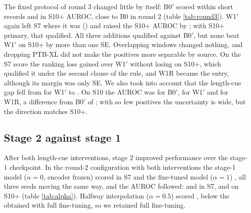 \documentclass{iopjournal}
\newcommand{\Bp}{B0$'$}
\newcommand{\Wp}{W1$'$}
\begin{document}
The fixed protocol of round 3 changed little by itself: \Bp{} scored \rThreeBzSseven{} within short records and \rThreeBzStenPlusAuc{} in S10+ AUROC, close to B0 in round 2 (table \ref{tab:round3}). \Wp{} again left S7 where it was (\rThreeWoneDSseven) and raised the S10+ AUROC by \rThreeWoneDStenPlusAuc; with S10+ primary, that qualified. All three additions qualified against \Bp, but none beat \Wp{} on S10+ by more than one SE. Overlapping windows changed nothing, and dropping PTB-XL did not make the positives more separable by source. On the S7 score the ranking loss gained \rThreeWoneRVsWoneDSseven{} over \Wp{} without losing on S10+, which qualified it under the second clause of the rule, and W1R became the entry, although its margin was only \rThreeWoneRVsWoneNse{} SE. We also took into account that the length-cue gap fell from \rThreeWoneGap{} for \Wp{} to \rThreeWoneRGap. On S10 the AUROC was \rThreeBzStenAuc{} for \Bp, \rThreeWoneStenAuc{} for \Wp{} and \rThreeWoneRStenAuc{} for W1R, a difference from \Bp{} of \rThreeWoneRDStenAuc; with so few positives the uncertainty is wide, but the direction matches S10+.

\begin{table}
\caption{Round 3, under the fixed validation protocol (three seeds unless stated). \Bp{} and \Wp{} are re-trained and are not the round-2 models. $\Delta$ is the difference from the \Bp{} mean, with the SE of a paired bootstrap. S10+ mixes CODE-15\% negatives with mostly SaMi-Trop positives; S10 is CODE-15\% only, with \nStenPos{} positives. Supplementary note 4 shows the same runs seed by seed.}
\centering
\resizebox{\textwidth}{!}{}
\label{tab:round3}
\end{table}

\subsection{Stage 2 against stage 1}
\label{sec:res-ft}
After both length-cue interventions, stage 2 improved performance over the stage-1 checkpoint. In the round-2 configuration with both interventions the stage-1 model ($\alpha=0$, encoder frozen) scored \frozenSseven{} in S7 and the fine-tuned model ($\alpha=1$) \mwSseven, all three seeds moving the same way, and the AUROC followed: \frozenSsevenAuc{} and \mwSsevenAuc{} in S7, \frozenStenPlusAuc{} and \mwStenPlusAuc{} on S10+ (table \ref{tab:alpha}). Halfway interpolation ($\alpha=0.5$) scored \halfSseven, below the \mwSseven{} obtained with full fine-tuning, so we retained full fine-tuning.
\end{document}
